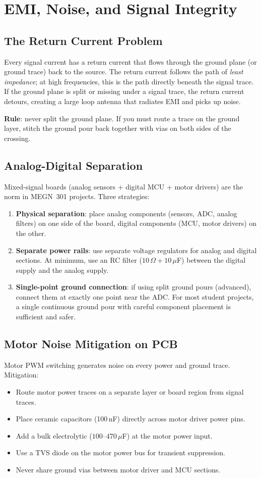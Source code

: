 \documentclass[11pt,letterpaper,twoside,openany]{book}
\begin{document}
\section{EMI, Noise, and Signal Integrity}

\subsection{The Return Current Problem}
Every signal current has a return current that flows through the ground plane (or ground trace) back to the source. The return current follows the path of \emph{least impedance}; at high frequencies, this is the path directly beneath the signal trace. If the ground plane is split or missing under a signal trace, the return current detours, creating a large loop antenna that radiates EMI and picks up noise.

\textbf{Rule}: never split the ground plane. If you must route a trace on the ground layer, stitch the ground pour back together with vias on both sides of the crossing.

\subsection{Analog-Digital Separation}
Mixed-signal boards (analog sensors + digital MCU + motor drivers) are the norm in MEGN~301 projects. Three strategies:
\begin{enumerate}[nosep,leftmargin=1.5em]
\item \textbf{Physical separation}: place analog components (sensors, ADC, analog filters) on one side of the board, digital components (MCU, motor drivers) on the other.
\item \textbf{Separate power rails}: use separate voltage regulators for analog and digital sections. At minimum, use an RC filter ($10\,\Omega + 10\,\mu$F) between the digital supply and the analog supply.
\item \textbf{Single-point ground connection}: if using split ground pours (advanced), connect them at exactly one point near the ADC. For most student projects, a single continuous ground pour with careful component placement is sufficient and safer.
\end{enumerate}

\subsection{Motor Noise Mitigation on PCB}
Motor PWM switching generates noise on every power and ground trace. Mitigation:
\begin{itemize}[nosep,leftmargin=1.5em]
\item Route motor power traces on a separate layer or board region from signal traces.
\item Place ceramic capacitors (100\,nF) directly across motor driver power pins.
\item Add a bulk electrolytic ($100$--$470\,\mu$F) at the motor power input.
\item Use a TVS diode on the motor power bus for transient suppression.
\item Never share ground vias between motor driver and MCU sections.
\end{itemize}
\end{document}
